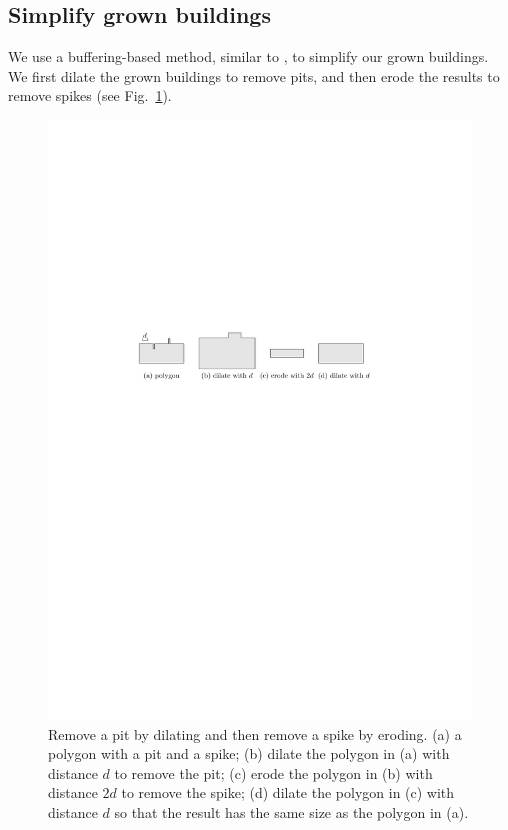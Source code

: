 \documentclass[graybox]{svmult}
\newcommand{\fig}{Fig.~}
\begin{document}
\subsection{Simplify grown buildings}
\label{sec:Simplify}
We use a buffering-based method, 
similar to \textcite{Damen2008,Meijers2016}, 
to simplify our grown buildings. 
We first dilate the grown buildings to remove 
pits, and then erode the results to remove spikes
(see \fig\ref{fig:RemovePitAndSpike}).

\begin{figure}[tb]
	\centering
	\includegraphics[draft=true]{RemovePitAndSpike}
	\caption{Remove a pit by dilating and then remove a spike by eroding.
		(a) a polygon with a pit and a spike;
		(b) dilate the polygon in (a) with distance $d$ to remove the pit;
		(c) erode the polygon in (b) with distance $2d$ to remove the spike;
		(d) dilate the polygon in (c) with distance $d$ so that the result has 
		the same size as the polygon in (a).
	}
	\label{fig:RemovePitAndSpike}
\end{figure}
\end{document}
